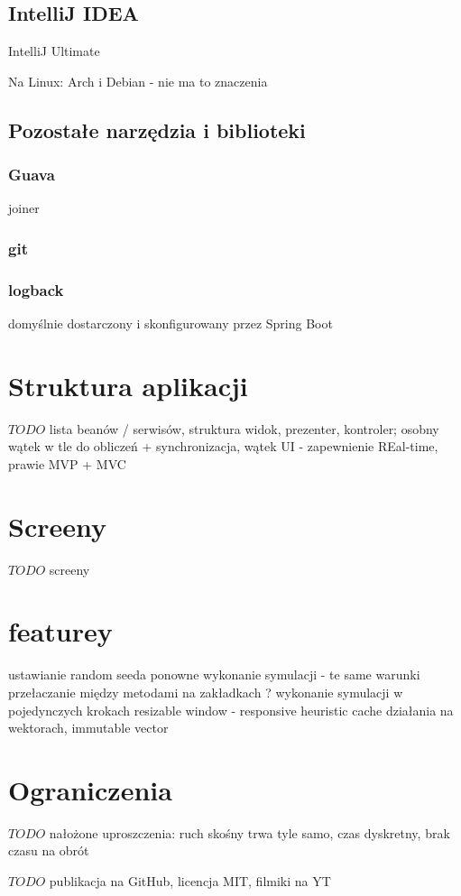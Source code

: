 \subsection{IntelliJ IDEA}
IntelliJ Ultimate

Na Linux: Arch i Debian - nie ma to znaczenia

\subsection{Pozostałe narzędzia i biblioteki}
\subsubsection{Guava}
joiner
\subsubsection{git}
\subsubsection{logback}
domyślnie dostarczony i skonfigurowany przez Spring Boot


\section{Struktura aplikacji}
$TODO$ lista beanów / serwisów, struktura widok, prezenter, kontroler; osobny wątek w tle do obliczeń + synchronizacja, wątek UI - zapewnienie REal-time, prawie MVP + MVC


\section{Screeny}
$TODO$ screeny

\section{featurey}
ustawianie random seeda
ponowne wykonanie symulacji - te same warunki
przełaczanie między metodami na zakładkach ?
wykonanie symulacji w pojedynczych krokach
resizable window - responsive
heuristic cache
działania na wektorach, immutable vector

\section{Ograniczenia}
$TODO$ nałożone uproszczenia: ruch skośny trwa tyle samo, czas dyskretny, brak czasu na obrót

$TODO$ publikacja na GitHub, licencja MIT, filmiki na YT